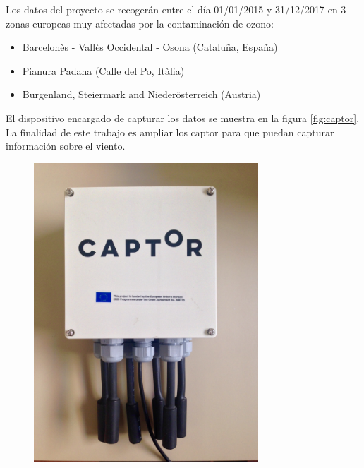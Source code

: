 \documentclass[a4paper, 11pt]{article}
\begin{document}
Los datos del proyecto se recogerán entre el día 01/01/2015 y 31/12/2017 en 3 zonas europeas muy afectadas por la contaminación de ozono:

\begin{itemize}
	\item Barcelonès - Vallès Occidental - Osona (Cataluña, España)
	\item Pianura Padana (Calle del Po, Itàlia)
	\item Burgenland, Steiermark and Niederösterreich (Austria)
\end{itemize}

El dispositivo encargado de capturar los datos se muestra en la figura \ref{fig:captor}. La finalidad de este trabajo es ampliar los captor para que puedan capturar información sobre el viento.

\begin{figure}[h]
\centering
	\begin{minipage}{0.5\textwidth}
	\centering
	\includegraphics[width=0.75\textwidth]{img/Captor1.jpg}
	\end{minipage}%
	\begin{minipage}{0.5\textwidth}
	\centering

\end{minipage}
\end{figure}
\end{document}
